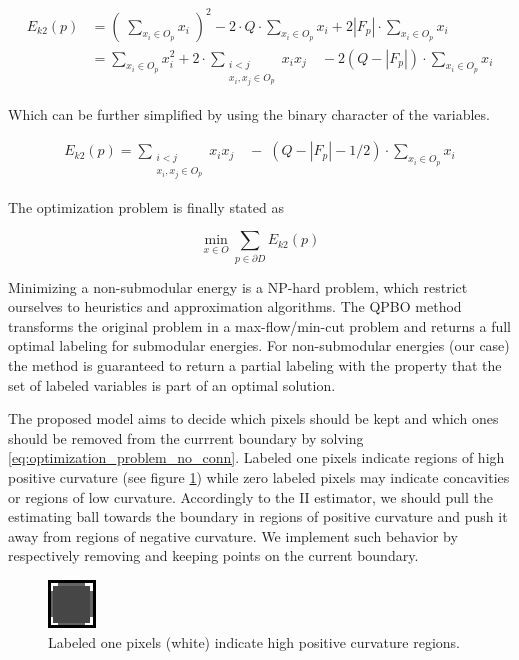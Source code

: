 \documentclass[runningheads]{llncs}
\begin{document}
	\begin{align*}
		E_{k2}(p) &= \left( \; \sum_{x_i \in O_{p}}{x_i} \; \right) ^2 -2 \cdot Q\cdot \sum_{x_i \in O_{p}}{x_i} + 2 |F_p| \cdot \sum_{ x_i \in O_{p} }{x_i} \\[1em]
		&= \sum_{x_i \in O_{p}}{x_i^2} + 2 \cdot \sum_{ \substack{ i<j \\ x_i,x_j \in O_{p}  } }{x_ix_j} \quad - 2 (Q-|F_p|)\cdot \sum_{x_i \in O_{p}}{x_i}
	\end{align*}
	
	Which can be further simplified by using the binary character of the variables.
	
	\begin{align*}
		E_{k2}(p) =\sum_{ \substack{ i<j \\ x_i,x_j \in O_{p}  } }{x_ix_j} \quad  - \;(Q-|F_p|-1/2)\cdot \sum_{x_i \in O_{p}}{x_i}
	\end{align*}	
	
	The optimization problem is finally stated as
	
	\begin{equation}
		\min_{x \in O} \sum_{p \in \partial D}E_{k2}(p)
		\label{eq:optimization_problem_no_conn}
	\end{equation}
	
	Minimizing a non-submodular energy is a NP-hard problem, which restrict ourselves to heuristics and approximation algorithms. The QPBO method \cite{kolmogorov07} transforms the original problem in a max-flow/min-cut problem and returns a full optimal labeling for submodular energies. For non-submodular energies (our case) the method is guaranteed to return a partial labeling with the property that the set of labeled variables is part of an optimal solution. 
	
	The proposed model aims to decide which pixels should be kept and which ones should be removed from the currrent boundary by solving \eqref{eq:optimization_problem_no_conn}. Labeled one pixels indicate regions of high positive curvature (see figure \ref{fig:naive_solution})	while zero labeled pixels may indicate concavities or regions of low curvature. Accordingly to the II estimator, we should pull the estimating ball towards the boundary in regions of positive curvature and push it away from regions of negative curvature. We implement such behavior by respectively removing and keeping points on the current boundary.
	
	
	\begin{figure}[!ht]
		\center
		\includegraphics[scale=2.0]{images/qbo_1D_naive_solution_noneigh.png}
		\caption{Labeled one pixels (white) indicate high positive curvature regions.}
		\label{fig:naive_solution}
	\end{figure}	
	
\end{document}
